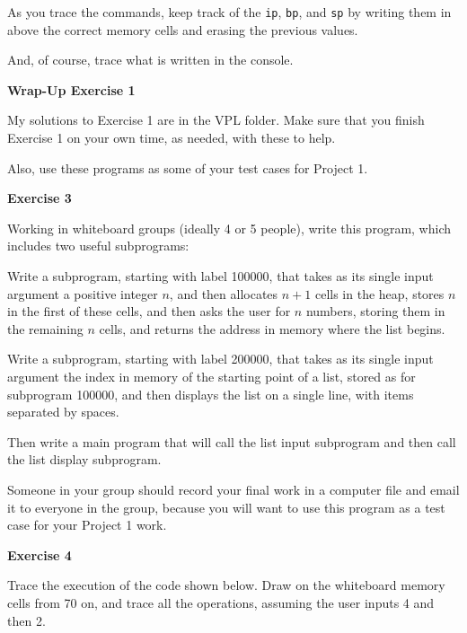 As you trace the commands, keep track of the {\tt ip}, {\tt bp}, and {\tt sp}
by writing them in above the correct memory cells and erasing the previous
values.
\medskip

And, of course, trace what is written in the console.
\vfil\eject

{\bf Wrap-Up Exercise 1}
\medskip

My solutions to Exercise 1 are in the VPL folder.
Make sure that you finish Exercise 1 on your own time,
as needed, with these to help.
\medskip

Also, use these programs as some of your test cases for Project 1.
\border

{\bf Exercise 3}
\medskip

Working in whiteboard groups (ideally 4 or 5 people), 
write this program, which includes two useful subprograms:
\medskip

Write a subprogram, starting with label 100000,
 that takes as its single input argument a positive integer $n$, and then
 allocates $n+1$ cells in the heap, stores $n$ in the first of these
 cells, and then asks the user for $n$ numbers, storing them in the remaining $n$ cells,
 and returns the address in memory where the list begins.
 \medskip
 
 Write a subprogram, starting with label 200000,
 that takes as its single input argument the index in memory of the
 starting point of a list, stored as for subprogram 100000,
 and then displays the list on a single line, with items separated by spaces.
 \medskip

Then write a main program that will call the list input subprogram and then call the
list display subprogram.
\medskip

Someone in your group should record your final work in a computer file and email it
to everyone in the group, because you will want to use this program as a test case
for your Project 1 work.
\border
\Outdent

\vfil\eject

{\bf Exercise 4}  
\medskip

Trace the execution of the code shown below.  
Draw on the whiteboard memory cells from 70 on, and trace
all the operations, assuming the user inputs 4 and then 2.
\medskip

